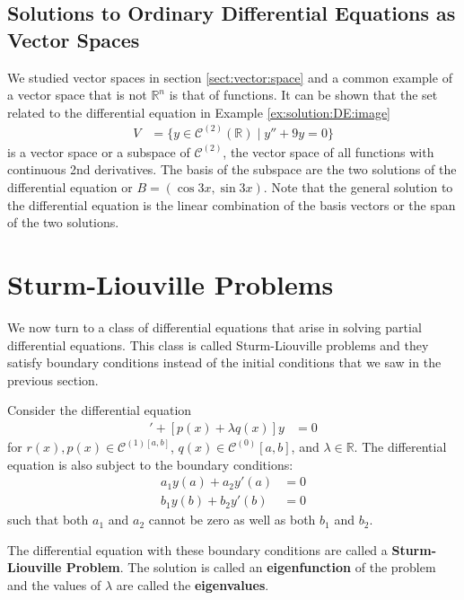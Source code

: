 \subsection{Solutions to Ordinary Differential Equations as Vector Spaces}

We studied vector spaces in section \ref{sect:vector:space} and a common example of a vector space that is not $\mathbb{R}^n$ is that of functions.  It can be shown that the set related to the differential equation in Example \ref{ex:solution:DE:image}
%
\begin{align*}
V & = \{ y \in \mathcal{C}^{(2)}(\mathbb{R}) \; | \; y'' + 9 y = 0 \}
\end{align*}
is a vector space or a subspace of $\mathcal{C}^{(2)}$, the vector space of all functions with continuous 2nd derivatives.  The basis of the subspace are the two solutions of the differential equation or $B=(\cos 3x, \sin 3x)$.  Note that the general solution to the differential equation is the linear combination of the basis vectors or the span of the two solutions.  



\section{Sturm-Liouville Problems }  \label{sect:sturm:liouville}

We now turn to a class of differential equations that arise in solving partial differential equations.  This class is called Sturm-Liouville problems and they satisfy boundary conditions instead of the initial conditions that we saw in the previous section.  

\begin{definition}
Consider the differential equation 
%
\begin{align*}
[r(x) y']' + [p(x) + \lambda q(x)] y & = 0 
\end{align*}
for $r(x), p(x) \in \mathcal{C}^{(1)[a,b]}$, $q(x)\in \mathcal{C}^{(0)}[a,b]$, and $\lambda \in \mathbb{R}$.  The differential equation is also subject to the boundary conditions:
\begin{align*}
a_1 y(a) + a_2 y'(a) & = 0 \\
b_1 y(b) + b_2 y'(b) & = 0 
\end{align*}
such that both $a_1$ and $a_2$ cannot be zero as well as both $b_1$ and $b_2$.  

The differential equation with these boundary conditions are called a \textbf{Sturm-Liouville Problem}.  The solution is called an \textbf{eigenfunction} of the problem and the values of $\lambda$ are called the \textbf{eigenvalues}.

\end{definition}

